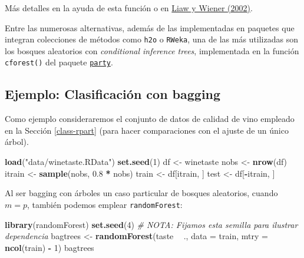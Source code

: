 \documentclass[
]{book}
\newenvironment{Shaded}{\begin{snugshade}}{\end{snugshade}}
\newcommand{\CommentTok}[1]{\textcolor[rgb]{0.56,0.35,0.01}{\textit{#1}}}
\newcommand{\DataTypeTok}[1]{\textcolor[rgb]{0.13,0.29,0.53}{#1}}
\newcommand{\DecValTok}[1]{\textcolor[rgb]{0.00,0.00,0.81}{#1}}
\newcommand{\FloatTok}[1]{\textcolor[rgb]{0.00,0.00,0.81}{#1}}
\newcommand{\KeywordTok}[1]{\textcolor[rgb]{0.13,0.29,0.53}{\textbf{#1}}}
\newcommand{\NormalTok}[1]{#1}
\newcommand{\OperatorTok}[1]{\textcolor[rgb]{0.81,0.36,0.00}{\textbf{#1}}}
\newcommand{\StringTok}[1]{\textcolor[rgb]{0.31,0.60,0.02}{#1}}
\theoremstyle{break}
\theoremstyle{definition}
\theoremstyle{definition}
\theoremstyle{definition}
\theoremstyle{remark}
\begin{document}
Más detalles en la ayuda de esta función o en \href{https://www.r-project.org/doc/Rnews/Rnews_2002-3.pdf}{Liaw y Wiener (2002)}.

Entre las numerosas alternativas, además de las implementadas en paquetes que integran colecciones de métodos como \texttt{h2o} o \texttt{RWeka}, una de las más utilizadas son los bosques aleatorios con \emph{conditional inference trees}, implementada en la función \texttt{cforest()} del paquete \href{https://CRAN.R-project.org/package=party}{\texttt{party}}.

\hypertarget{ejemplo-clasificaciuxf3n-con-bagging}{%
\subsection{Ejemplo: Clasificación con bagging}\label{ejemplo-clasificaciuxf3n-con-bagging}}

Como ejemplo consideraremos el conjunto de datos de calidad de vino empleado en la Sección \ref{class-rpart} (para hacer comparaciones con el ajuste de un único árbol).

\begin{Shaded}
\begin{Highlighting}[]
\KeywordTok{load}\NormalTok{(}\StringTok{"data/winetaste.RData"}\NormalTok{)}
\KeywordTok{set.seed}\NormalTok{(}\DecValTok{1}\NormalTok{)}
\NormalTok{df <-}\StringTok{ }\NormalTok{winetaste}
\NormalTok{nobs <-}\StringTok{ }\KeywordTok{nrow}\NormalTok{(df)}
\NormalTok{itrain <-}\StringTok{ }\KeywordTok{sample}\NormalTok{(nobs, }\FloatTok{0.8} \OperatorTok{*}\StringTok{ }\NormalTok{nobs)}
\NormalTok{train <-}\StringTok{ }\NormalTok{df[itrain, ]}
\NormalTok{test <-}\StringTok{ }\NormalTok{df[}\OperatorTok{-}\NormalTok{itrain, ]}
\end{Highlighting}
\end{Shaded}

Al ser bagging con árboles un caso particular de bosques aleatorios, cuando \(m = p\), también podemos emplear \texttt{randomForest}:

\begin{Shaded}
\begin{Highlighting}[]
\KeywordTok{library}\NormalTok{(randomForest)}
\KeywordTok{set.seed}\NormalTok{(}\DecValTok{4}\NormalTok{) }\CommentTok{# NOTA: Fijamos esta semilla para ilustrar dependencia}
\NormalTok{bagtrees <-}\StringTok{ }\KeywordTok{randomForest}\NormalTok{(taste }\OperatorTok{~}\StringTok{ }\NormalTok{., }\DataTypeTok{data =}\NormalTok{ train, }\DataTypeTok{mtry =} \KeywordTok{ncol}\NormalTok{(train) }\OperatorTok{-}\StringTok{ }\DecValTok{1}\NormalTok{)}
\NormalTok{bagtrees}
\end{Highlighting}
\end{Shaded}
\end{document}
